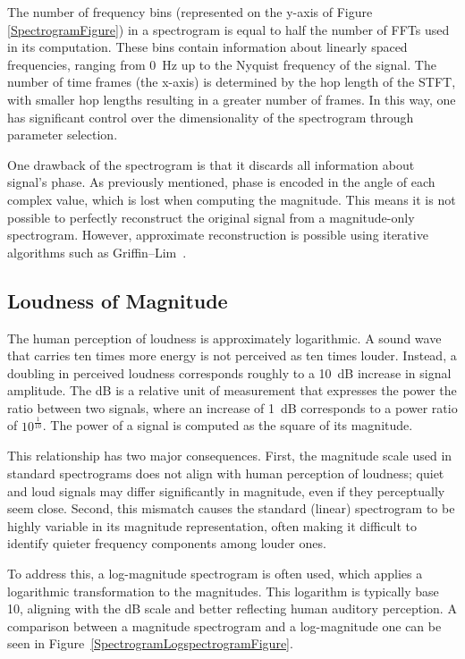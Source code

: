 The number of frequency bins (represented on the y-axis of Figure \ref{SpectrogramFigure}) in a spectrogram is equal to half the number of \glspl{FFT} used in its computation. These bins contain information about linearly spaced frequencies, ranging from 0~Hz up to the Nyquist frequency of the signal. The number of time frames (the x-axis) is determined by the hop length of the \gls{STFT}, with smaller hop lengths resulting in a greater number of frames. In this way, one has significant control over the dimensionality of the spectrogram through parameter selection. 

One drawback of the spectrogram is that it discards all information about signal's phase. As previously mentioned, phase is encoded in the angle of each complex value, which is lost when computing the magnitude. This means it is not possible to perfectly reconstruct the original signal from a magnitude-only spectrogram. However, approximate reconstruction is possible using iterative algorithms such as Griffin–Lim~\cite{1164317}.

\subsection{Loudness of Magnitude}

The human perception of loudness is approximately logarithmic. A sound wave that carries ten times more energy is not perceived as ten times louder. Instead, a doubling in perceived loudness corresponds roughly to a 10~\gls{dB} increase in signal amplitude. The \acrlong{dB} is a relative unit of measurement that expresses the power the ratio between two signals, where an increase of 1~\gls{dB} corresponds to a power ratio of $10^\frac{1}{10}$. The power of a signal is computed as the square of its magnitude. 

This relationship has two major consequences. First, the magnitude scale used in standard spectrograms does not align with human perception of loudness; quiet and loud signals may differ significantly in magnitude, even if they perceptually seem close. Second, this mismatch causes the standard (linear) spectrogram to be highly variable in its magnitude representation, often making it difficult to identify quieter frequency components among louder ones.

To address this, a log-magnitude spectrogram is often used, which applies a logarithmic transformation to the magnitudes. This logarithm is typically base 10, aligning with the \acrlong{dB} scale and better reflecting human auditory perception. A comparison between a magnitude spectrogram and a log-magnitude one can be seen in Figure~\ref{SpectrogramLogspectrogramFigure}.

